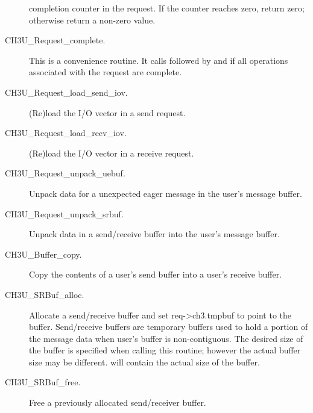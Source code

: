 \documentclass{article}
\begin{document}
\begin{description}
completion counter in the request.  If the counter reaches zero,
return zero; otherwise return a non-zero value.
\item[CH3U\_Request\_complete.]This is a convenience routine.  It
calls  followed by
 and 
if all operations associated with the request are complete.
\item[CH3U\_Request\_load\_send\_iov.](Re)load the I/O vector in a
send request.
\item[CH3U\_Request\_load\_recv\_iov.](Re)load the I/O vector in a
receive request.
\item[CH3U\_Request\_unpack\_uebuf.]Unpack data for a unexpected eager
message in the user's message buffer.
\item[CH3U\_Request\_unpack\_srbuf.]Unpack data in a send/receive
buffer into the user's message buffer.
\item[CH3U\_Buffer\_copy.]Copy the contents of a user's send buffer
into a user's receive buffer.
\item[CH3U\_SRBuf\_alloc.]Allocate a send/receive buffer and set
req->ch3.tmpbuf to point to the buffer.  Send/receive buffers are
temporary buffers used to hold a portion of the message data when
user's buffer is non-contiguous.  The desired size of the buffer is
specified when calling this routine; however the actual buffer size
may be different.   will contain the actual size
of the buffer.
\item[CH3U\_SRBuf\_free.]Free a previously allocated send/receiver buffer.
\end{description}
\end{document}
